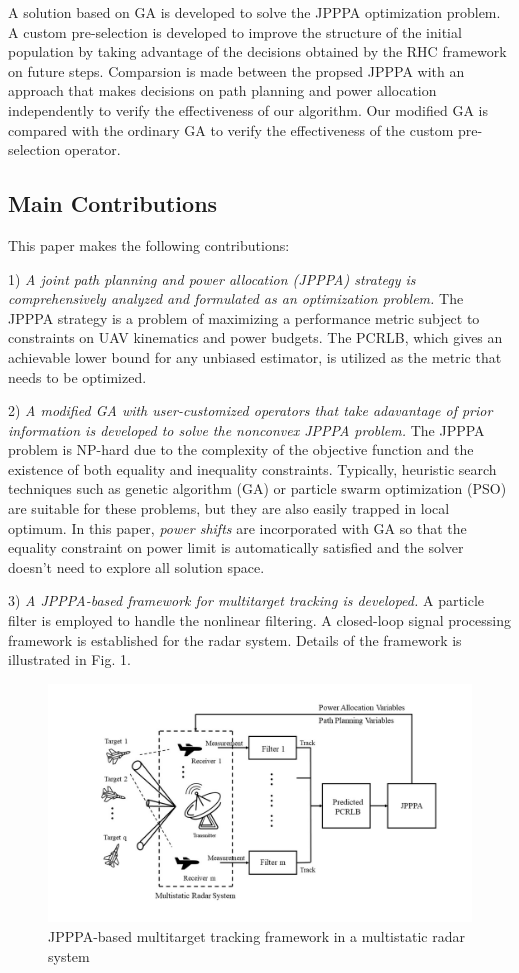 \documentclass[12pt,journal,draftclsnofoot,onecolumn]{IEEEtran}
\begin{document}
A solution based on GA is developed to solve the JPPPA optimization problem. A custom pre-selection is developed to improve the structure of the initial population by taking advantage of the decisions obtained by the RHC framework on future steps. Comparsion is made between the propsed JPPPA with an approach that makes decisions on path planning and power allocation independently to verify the effectiveness of our algorithm. Our modified GA is compared with the ordinary GA to verify the effectiveness of the custom pre-selection operator.


\subsection{Main Contributions}
This paper makes the following contributions:

1) \emph{A joint path planning and power allocation (JPPPA) strategy is comprehensively analyzed and formulated as an optimization problem.} The JPPPA strategy is a problem of maximizing a performance metric subject to constraints on UAV kinematics and power budgets. The PCRLB, which gives an achievable lower bound for any unbiased estimator, is utilized as the metric that needs to be optimized.

2) \emph{A modified GA with user-customized operators that take adavantage of prior information is developed to solve the nonconvex JPPPA problem.} The JPPPA problem is NP-hard due to the complexity of the objective function and the existence of both equality and inequality constraints. Typically, heuristic search techniques such as genetic algorithm (GA) or particle swarm optimization (PSO) are suitable for these problems, but they are also easily trapped in local optimum. In this paper, \emph{power shifts} are incorporated with GA so that the equality constraint on power limit is automatically satisfied and the solver doesn't need to explore all solution space.

3) \emph{A JPPPA-based framework for multitarget tracking is developed.} A particle filter is employed to handle the nonlinear filtering. A closed-loop signal processing framework is established for the radar system. Details of the framework is illustrated in Fig. 1.

\begin{figure}
	\centering
	\includegraphics[scale=0.28]{Flow Chart.jpg}
	\caption{JPPPA-based multitarget tracking framework in a multistatic radar system}
	\label{fig:system}
\end{figure}
\end{document}
